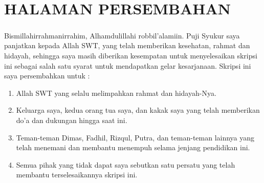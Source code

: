 \documentclass[../SKRIPSI_ALDZIKRI_DWIJAYANTO_PRATHAMA.tex]{subfiles}
\begin{document}
\chapter*{HALAMAN PERSEMBAHAN}
\begin{doublespace}
\paragraph*{}Bismillahirrahmanirrahim, Alhamdulillahi
robbil’alamiin. Puji Syukur saya panjatkan kepada Allah
SWT, yang telah memberikan kesehatan, rahmat dan hidayah,
sehingga saya masih diberikan kesempatan untuk
menyelesaikan skripsi ini sebagai salah satu syarat untuk
mendapatkan gelar kesarjanaan. Skripsi ini saya
persembahkan untuk :
\begin{enumerate}
  \item Allah SWT yang selalu melimpahkan rahmat dan hidayah-Nya.
  \item Keluarga saya, kedua orang tua saya, dan kakak saya yang telah
  memberikan do’a dan dukungan hingga saat ini.
  \item Teman-teman Dimas, Fadhil, Rizqul, Putra, dan
  teman-teman lainnya yang telah menemani dan membantu
  menempuh selama jenjang pendidikan ini.
  \item Semua pihak yang tidak dapat saya sebutkan satu persatu yang telah membantu terselesaikannya skripsi ini.
\end{enumerate}
\end{doublespace}
\end{document}
